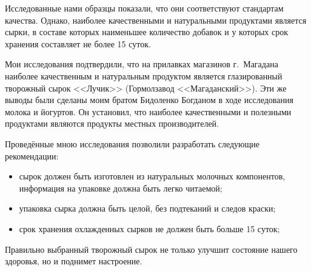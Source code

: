 Исследованные нами образцы показали, что они соответствуют стандартам качества. Однако, наиболее качественными и натуральными продуктами является сырки, в составе которых наименьшее количество добавок и у которых срок хранения составляет не более 15 суток.

Мои исследования подтвердили, что на прилавках магазинов г.~Магадана наиболее качественным и натуральным продуктом является глазированный творожный сырок <<Лучик>> (Гормолзавод <<Магаданский>>). Эти же выводы были сделаны моим братом Бидоленко Богданом в ходе исследования молока и йогуртов. Он установил, что наиболее качественными и полезными продуктами являются продукты местных производителей.

Проведённые мною исследования позволили разработать следующие рекомендации:
\begin{itemize}[noitemsep]\vspace{-8pt}
\item сырок должен быть изготовлен из натуральных молочных компонентов, информация на упаковке должна быть легко читаемой;
\item упаковка сырка должна быть целой, без подтеканий и следов краски;
\item срок хранения охлажденных сырков не должен быть больше 15 суток;
\end{itemize}\vspace{-8pt}

Правильно выбранный творожный сырок не только улучшит состояние нашего здоровья, но и поднимет настроение.
